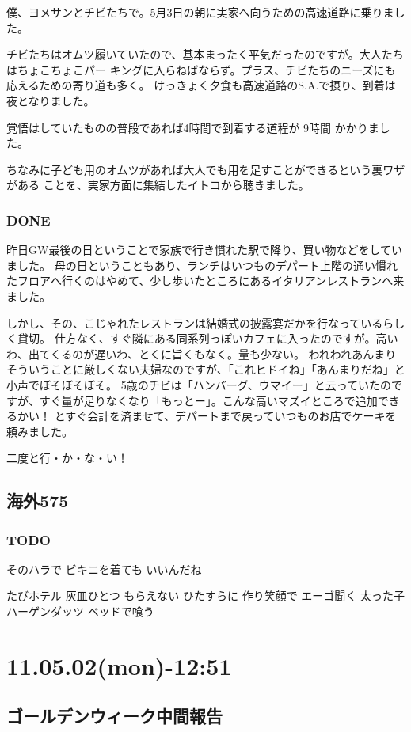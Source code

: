 \documentclass[11pt]{article}
\begin{document}
僕、ヨメサンとチビたちで。5月3日の朝に実家へ向うための高速道路に乗りました。

チビたちはオムツ履いていたので、基本まったく平気だったのですが。大人たちはちょこちょこパー
キングに入らねばならず。プラス、チビたちのニーズにも応えるための寄り道も多く。
けっきょく夕食も高速道路のS.A.で摂り、到着は夜となりました。

覚悟はしていたものの普段であれば4時間で到着する道程が 9時間 かかりました。

ちなみに子ども用のオムツがあれば大人でも用を足すことができるという裏ワザがある
ことを、実家方面に集結したイトコから聴きました。
\subsubsection{\textbf{DONE}}
\label{sec-126_1_2}

昨日GW最後の日ということで家族で行き慣れた駅で降り、買い物などをしていました。
母の日ということもあり、ランチはいつものデパート上階の通い慣れたフロアへ行くのはやめて、少し歩いたところにあるイタリアンレストランへ来ました。

しかし、その、こじゃれたレストランは結婚式の披露宴だかを行なっているらしく貸切。
仕方なく、すぐ隣にある同系列っぽいカフェに入ったのですが。高いわ、出てくるのが遅いわ、とくに旨くもなく。量も少ない。
われわれあんまりそういうことに厳しくない夫婦なのですが、「これヒドイね」「あんまりだね」と小声でぼそぼそぼそ。
5歳のチビは「ハンバーグ、ウマイー」と云っていたのですが、すぐ量が足りなくなり「もっとー」。こんな高いマズイところで追加できるかい！ とすぐ会計を済ませて、デパートまで戻っていつものお店でケーキを頼みました。

二度と行・か・な・い！
\subsection{海外575}
\label{sec-126_2}
\subsubsection{\textbf{TODO}}
\label{sec-126_2_1}

そのハラで ビキニを着ても いいんだね

たびホテル 灰皿ひとつ もらえない
ひたすらに 作り笑顔で エーゴ聞く
太った子 ハーゲンダッツ ベッドで喰う
\section{11.05.02(mon)-12:51}
\label{sec-127}
\subsection{ゴールデンウィーク中間報告}
\label{sec-127_1}
\end{document}
